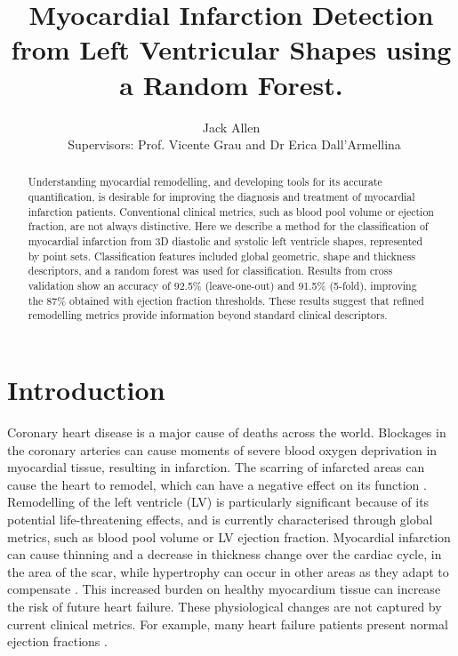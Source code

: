 \documentclass[journal]{IEEEtran}
\begin{document}
\title{Myocardial Infarction Detection from Left Ventricular Shapes using a Random Forest.}

\author{Jack Allen
\\\ Supervisors: Prof. Vicente Grau and Dr Erica Dall'Armellina}


\maketitle              %
\begin{abstract}
Understanding myocardial remodelling, and developing tools for its accurate quantification, is desirable for improving the diagnosis and treatment of myocardial infarction patients. Conventional clinical metrics, such as blood pool volume or ejection fraction, are not always distinctive. Here we describe a method for the classification of myocardial infarction from 3D diastolic and systolic left ventricle shapes, represented by point sets. Classification features included global geometric, shape and thickness descriptors, and a random forest was used for classification. Results from cross validation show an accuracy of 92.5\% (leave-one-out) and 91.5\% (5-fold), improving the 87\% obtained with ejection fraction thresholds. These results suggest that refined remodelling metrics provide information beyond standard clinical descriptors.
\end{abstract}


%
\section{Introduction}
Coronary heart disease is a major cause of deaths across the world. Blockages in the coronary arteries can cause moments of severe blood oxygen deprivation in myocardial  tissue, resulting in infarction.
The scarring of infarcted areas can cause the heart to remodel, which can have a negative effect on its function \cite{Sutton2000}.
Remodelling of the left ventricle (LV) is particularly significant because of its potential life-threatening effects, and is currently characterised through global metrics, such as blood pool volume or LV ejection fraction. Myocardial infarction can cause thinning and a decrease in thickness change over the cardiac cycle, in the area of the scar, while hypertrophy can occur in other areas as they adapt to compensate \cite{Sutton2000}. This increased burden on healthy myocardium tissue can increase the risk of future heart failure. These physiological changes are not captured by current clinical metrics. For example, many heart failure patients present normal ejection fractions \cite{Sanderson2007}.
\end{document}
